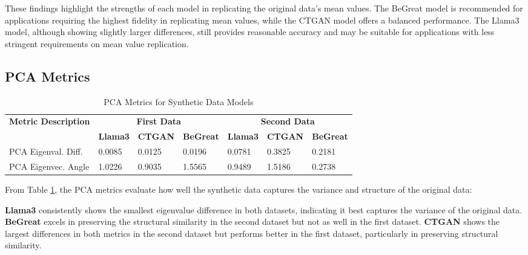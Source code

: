 \vspace{0.5cm}

These findings highlight the strengths of each model in replicating the original data's mean values. The BeGreat model is recommended for applications requiring the highest fidelity in replicating mean values, while the CTGAN model offers a balanced performance. The Llama3 model, although showing slightly larger differences, still provides reasonable accuracy and may be suitable for applications with less stringent requirements on mean value replication.




\subsection{PCA Metrics}

\begin{table}[H]
\centering
\caption{PCA Metrics for Synthetic Data Models}
\label{tab:pca_metrics_combined}
\begin{tabularx}{\textwidth}{l*{6}{X}}
    \toprule
    \textbf{Metric Description} & \multicolumn{3}{c}{\textbf{First Data}} & \multicolumn{3}{c}{\textbf{Second Data}} \\
    \cmidrule(lr){2-4} \cmidrule(lr){5-7}
    & \textbf{Llama3} & \textbf{CTGAN} & \textbf{BeGreat} & \textbf{Llama3} & \textbf{CTGAN} & \textbf{BeGreat} \\
    \midrule
    PCA Eigenval. Diff. & 0.0085 & 0.0125 & 0.0196 & 0.0781 & 0.3825 & 0.2181 \\
    PCA Eigenvec. Angle & 1.0226 & 0.9035 & 1.5565 & 0.9489 & 1.5186 & 0.2738 \\
    \bottomrule
\end{tabularx}
\end{table}


From Table \ref{tab:pca_metrics_combined}, the PCA metrics evaluate how well the synthetic data captures the variance and structure of the original data:

\textbf{Llama3} consistently shows the smallest eigenvalue difference in both datasets, indicating it best captures the variance of the original data.
\textbf{BeGreat} excels in preserving the structural similarity in the second dataset but not as well in the first dataset.
\textbf{CTGAN} shows the largest differences in both metrics in the second dataset but performs better in the first dataset, particularly in preserving structural similarity.

\vspace{0.5cm}

